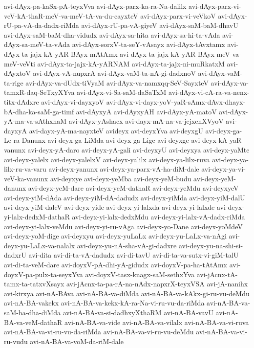 {avi-dAyx-pa-kaSx-pA-teyxVva
avi-dAyx-parx-ka-ra-Na-dalilx
avi-dAyx-parx-vi-veV-kA-thaR-meV-va-meV-tA-va-du-cayxteV
avi-dAyx-parx-vi-veVkoV
avi-dAyx-rU-pa-vA-da-dadx-riMda
avi-dAyx-rU-pa-vA-giyeV
avi-dAyx-saM-baM-dhavU
avi-dAyx-saM-baM-dha-vidudx
avi-dAyx-sa-hita
avi-dAyx-sa-hi-ta-vAda
avi-dAyx-sa-meV-ta-vAda
avi-dAyx-sorxV-ta-seY-vAsayx
avi-dAyx-tAvxtamx
avi-dAyx-ta-jajx-kA-yAR-BAyx-mAtAmx
avi-dAyx-ta-jajx-kA-yAR-BAyx-meV-va-meV-veVti
avi-dAyx-ta-jajx-kA-yARNAM
avi-dAyx-ta-jajx-ni-muRkatxM
avi-dAyxtoV
avi-dAyx-vA-nupxrA
avi-dAyx-vaM-ta-nA-gi-dadxnoV
avi-dAyx-vaM-ta-rige
avi-dAyx-va-dUdx-tiVyaM
avi-dAyx-va-namxqq-SeV-SayxteV
avi-dAyx-va-tamxR-daq-SeTxyXYva
avi-dAyx-vi-Sa-saM-daSaTxM
avi-dAyx-vi-cA-ra-va-nenx-titx-dAdxre
avi-dAyx-vi-dayxyoV
avi-dAyx-vi-dayx-yoV-yaR-sAmx-dAvx-dhayx-bA-dha-ka-saM-ga-timf
avi-dAyxyA
avi-dAyxyAH
avi-dAyx-yA-matoV
avi-dAyx-yA-ma-va-sAthxnaM
avi-dAyx-yAshacx
avi-dayx-mA-na-va-jejxcnXVyoV
avi-dayxyA
avi-dayx-yA-ma-nayxteV
avideyx
avi-deyxYva
avi-deyxgU
avi-deyx-ga-Le-ra-Danunx
avi-deyx-ga-LiMda
avi-deyx-ga-Lige
avi-deyxge
avi-deyx-kA-yaR-vanunx
avi-deyx-yA-daro
avi-deyx-yA-gali
avi-deyxyU
avi-deyxya
avi-deyx-yaMte
avi-deyx-yalelx
avi-deyx-yalelxV
avi-deyx-yalilx
avi-deyx-ya-lilx-ruva
avi-deyx-ya-lilx-ru-va-varu
avi-deyx-yanunx
avi-deyx-ya-parx-vA-ha-diM-dale
avi-deyx-ya-vi-veV-ka-vanunx
avi-deyxye
avi-deyx-yeMba
avi-deyx-yeM-budu
avi-deyx-yeM-danunx
avi-deyx-yeM-dare
avi-deyx-yeM-dathaR
avi-deyx-yeMdu
avi-deyxyeV
avi-deyx-yiM-dAda
avi-deyx-yiM-dA-dadudx
avi-deyx-yiMda
avi-deyx-yiM-dalU
avi-deyx-yiM-daleV
avi-deyx-yide
avi-deyx-yi-lalxda
avi-deyx-yi-lalxde
avi-deyx-yi-lalx-dedxM-dathaR
avi-deyx-yi-lalx-dedxMdu
avi-deyx-yi-lalx-vA-dadx-riMda
avi-deyx-yi-lalx-veMdu
avi-deyx-yi-ru-vAga
avi-deyx-yo-Dane
avi-deyx-yoMdeV
avi-deyx-yoM-dige
avi-deyxyu
avi-deyx-yuLaLx
avi-deyx-yu-LaLx-va-nAgi
avi-deyx-yu-LaLx-va-nalalx
avi-deyx-yu-nA-sha-vA-gi-dadxre
avi-deyx-yu-na-shi-si-dadxrU
avi-dita
avi-di-ta-vA-dadudx
avi-di-tavU
avi-di-ta-va-sutx-vi-giM-talU
avi-di-ta-veM-dare
avi-doyxV-pA-dhi-yA-gidudx
avi-doyxV-pa-ha-tAtAmx
avi-doyxV-pa-pulx-ta-seyxYva
avi-doyxV-tasx-knagx-saM-sethxYva
avi-jAcnx-tA-tamx-ta-tatxvXsayx
avi-jAcnx-ta-pa-rA-na-nAdx-napxrX-teyxVSA
avi-jA-nanihx
avi-kirxya
avi-nA-BAva
avi-nA-BA-va-diMda
avi-nA-BA-va-kAkx-gi-ru-vu-deMdu
avi-nA-BA-vakekx
avi-nA-BA-va-kekx-kA-ra-Na-vi-ru-vu-da-riMda
avi-nA-BA-va-saM-ba-dha-diMda
avi-nA-BA-va-si-dadhxyXthaRM
avi-nA-BA-vavU
avi-nA-BA-va-veM-dathaR
avi-nA-BA-va-vide
avi-nA-BA-va-vilalx
avi-nA-BA-va-vi-ruva
avi-nA-BA-va-vi-ru-vu-da-riMda
avi-nA-BA-va-vi-ru-vu-deMdu
avi-nA-BA-va-vi-ru-vudu
avi-nA-BA-va-voM-da-riM-dale
}
